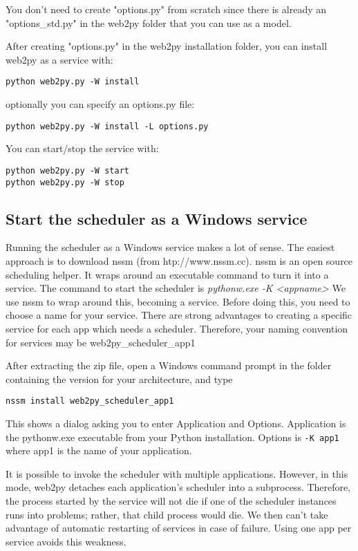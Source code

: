\documentclass[justified,sixbynine,notoc]{tufte-book}
\def\ft{\small\tt}
\def\inxx#1{\index{#1}}
\begin{document}
\begin{fullwidth}
You don't need to create "options.py" from scratch since there is already an "options\_std.py" in the web2py folder that you can use as a model.

After creating "options.py" in the web2py installation folder, you can install web2py as a service with:
\begin{lstlisting}
python web2py.py -W install
\end{lstlisting}
\noindent optionally you can specify an options.py file:

\begin{lstlisting}
python web2py.py -W install -L options.py
\end{lstlisting}

You can start/stop the service with:
\begin{lstlisting}
python web2py.py -W start
python web2py.py -W stop
\end{lstlisting}

\goodbreak\subsection{Start the scheduler as a Windows service}

\inxx{Windows scheduler service}

Running the scheduler as a Windows service makes a lot of sense.
The easiest approach is to download nssm (from htp://www.nssm.cc). nssm is an open source scheduling helper.
It wraps around an executable command to turn it into a service.
The command to start the scheduler is {\it pythonw.exe -K <appname>}
We use nssm to wrap around this, becoming a service.
Before doing this, you need to choose a name for your service.
There are strong advantages to creating a specific service for each app which needs a scheduler.
Therefore, your naming convention for services may be web2py\_scheduler\_app1

After extracting the zip file, open a Windows command prompt in the folder containing the version for your architecture, and type
\begin{lstlisting}
nssm install web2py_scheduler_app1
\end{lstlisting}

This shows a dialog asking you to enter Application and Options.
Application is the pythonw.exe executable from your Python installation.
Options is
{\ft -K app1}
where app1 is the name of your application.

It is possible to invoke the scheduler with multiple applications. However, in this mode, web2py detaches each application's scheduler into a subprocess.
Therefore, the process started by the service will not die if one of the scheduler instances runs into problems; rather, that child process would die.
We then can't take advantage of automatic restarting of services in case of failure. Using one app per service avoids this weakness.


\end{fullwidth}
\end{document}
